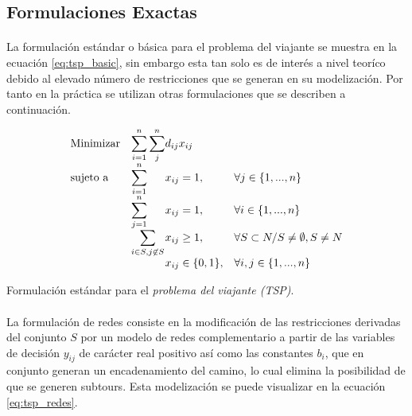 \documentclass[spanish]{article}
\begin{document}
		\subsection{Formulaciones Exactas}

			\paragraph{}
			La formulación estándar o básica para el problema del viajante se muestra en la ecuación \eqref{eq:tsp_basic}, sin embargo esta tan solo es de interés a nivel teoríco debido al elevado número de restricciones que se generan en su modelización. Por tanto en la práctica se utilizan otras formulaciones que se describen a continuación.

			\begin{eqfloat}
				\begin{equation}
					\begin{array}{ll@{}ll}
						\text{Minimizar}	& \displaystyle\sum\limits_{i = 1}^{n}\sum\limits_{j}^{n} & d_{ij}x_{ij} &\\
						\text{sujeto a}		& \displaystyle\sum\limits_{i = 1}^{n}	&	x_{ij} 	= 1,  & \forall j \in \{1,...,n\}\\
															& \displaystyle\sum\limits_{j = 1}^{n}	&	x_{ij} 	= 1,  & \forall i \in \{1,...,n\}\\
															& \displaystyle\sum\limits_{i \in S, j \not\in S}	&	x_{ij} 	\geq 1,  & \forall S \subset N / S \neq \emptyset, S \neq N \\
															&                               &	x_{ij} \in \{0,1\}, 	& \forall i,j \in \{1,...,n\}
					\end{array}
				\end{equation}
				\caption{Formulación estándar para el \emph{problema del viajante (TSP)}.}
				\label{eq:tsp_basic}
			\end{eqfloat}


			\paragraph{}
			La formulación de redes consiste en la modificación de las restricciones derivadas del conjunto $S$ por un modelo de redes complementario a partir de las variables de decisión $y_{ij}$ de carácter real positivo así como las constantes $b_i$, que en conjunto generan un encadenamiento del camino, lo cual elimina la posibilidad de que se generen subtours. Esta modelización se puede visualizar en la ecuación \eqref{eq:tsp_redes}.
\end{document}
